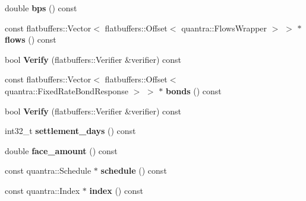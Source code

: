 \begin{DoxyCompactItemize}
double {\bfseries bps} () const
\item 
\mbox{\label{structquantra_1_1FLATBUFFERS__FINAL__CLASS_aadf140966c400eb42ab77cc5049538a0}} 
const flatbuffers\+::\+Vector$<$ flatbuffers\+::\+Offset$<$ quantra\+::\+Flows\+Wrapper $>$ $>$ $\ast$ {\bfseries flows} () const
\item 
\mbox{\label{structquantra_1_1FLATBUFFERS__FINAL__CLASS_aed693ee5a45b5f53af7411f9cab6793a}} 
bool {\bfseries Verify} (flatbuffers\+::\+Verifier \&verifier) const
\item 
\mbox{\label{structquantra_1_1FLATBUFFERS__FINAL__CLASS_a12e5ea116142db128ca4e889ac5c752b}} 
const flatbuffers\+::\+Vector$<$ flatbuffers\+::\+Offset$<$ quantra\+::\+Fixed\+Rate\+Bond\+Response $>$ $>$ $\ast$ {\bfseries bonds} () const
\item 
\mbox{\label{structquantra_1_1FLATBUFFERS__FINAL__CLASS_aed693ee5a45b5f53af7411f9cab6793a}} 
bool {\bfseries Verify} (flatbuffers\+::\+Verifier \&verifier) const
\item 
\mbox{\label{structquantra_1_1FLATBUFFERS__FINAL__CLASS_a2f95c4a4ab25cb17f5252fd7e6962827}} 
int32\+\_\+t {\bfseries settlement\+\_\+days} () const
\item 
\mbox{\label{structquantra_1_1FLATBUFFERS__FINAL__CLASS_a18b1ae24369d0fda26e8523a2afb53de}} 
double {\bfseries face\+\_\+amount} () const
\item 
\mbox{\label{structquantra_1_1FLATBUFFERS__FINAL__CLASS_a4980a75c547328bfac97fa23df17d655}} 
const quantra\+::\+Schedule $\ast$ {\bfseries schedule} () const
\item 
\mbox{\label{structquantra_1_1FLATBUFFERS__FINAL__CLASS_ae01144caafebbdbba931ba9e85f3da32}} 
const quantra\+::\+Index $\ast$ {\bfseries index} () const
\item 
\mbox{\label{structquantra_1_1FLATBUFFERS__FINAL__CLASS_ab03cf65ed2e6f70813f3bc9f43d2ca48}} 

\end{DoxyCompactItemize}
